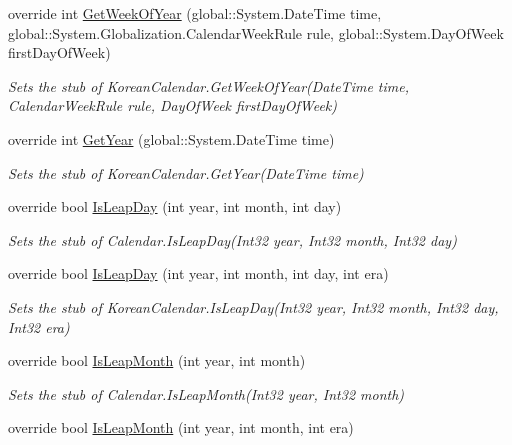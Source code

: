 \begin{DoxyCompactItemize}
override int \hyperlink{class_system_1_1_globalization_1_1_fakes_1_1_stub_korean_calendar_a8025520d395cb4f271adeee0053f9564}{Get\-Week\-Of\-Year} (global\-::\-System.\-Date\-Time time, global\-::\-System.\-Globalization.\-Calendar\-Week\-Rule rule, global\-::\-System.\-Day\-Of\-Week first\-Day\-Of\-Week)
\begin{DoxyCompactList}\small\item\em Sets the stub of Korean\-Calendar.\-Get\-Week\-Of\-Year(\-Date\-Time time, Calendar\-Week\-Rule rule, Day\-Of\-Week first\-Day\-Of\-Week)\end{DoxyCompactList}\item 
override int \hyperlink{class_system_1_1_globalization_1_1_fakes_1_1_stub_korean_calendar_acb488bfd04ab81bfa6b8bafd0552aaed}{Get\-Year} (global\-::\-System.\-Date\-Time time)
\begin{DoxyCompactList}\small\item\em Sets the stub of Korean\-Calendar.\-Get\-Year(\-Date\-Time time)\end{DoxyCompactList}\item 
override bool \hyperlink{class_system_1_1_globalization_1_1_fakes_1_1_stub_korean_calendar_a28f2947505a2d5ea5e25ab22902c70b1}{Is\-Leap\-Day} (int year, int month, int day)
\begin{DoxyCompactList}\small\item\em Sets the stub of Calendar.\-Is\-Leap\-Day(\-Int32 year, Int32 month, Int32 day)\end{DoxyCompactList}\item 
override bool \hyperlink{class_system_1_1_globalization_1_1_fakes_1_1_stub_korean_calendar_a92f8c4099bc78119d958514f75028ddb}{Is\-Leap\-Day} (int year, int month, int day, int era)
\begin{DoxyCompactList}\small\item\em Sets the stub of Korean\-Calendar.\-Is\-Leap\-Day(\-Int32 year, Int32 month, Int32 day, Int32 era)\end{DoxyCompactList}\item 
override bool \hyperlink{class_system_1_1_globalization_1_1_fakes_1_1_stub_korean_calendar_aeba1ea94a2c10d79e8440145fe3045ef}{Is\-Leap\-Month} (int year, int month)
\begin{DoxyCompactList}\small\item\em Sets the stub of Calendar.\-Is\-Leap\-Month(\-Int32 year, Int32 month)\end{DoxyCompactList}\item 
override bool \hyperlink{class_system_1_1_globalization_1_1_fakes_1_1_stub_korean_calendar_a012b44d84d2906ca9c3ab3f63ede4923}{Is\-Leap\-Month} (int year, int month, int era)

\end{DoxyCompactItemize}

